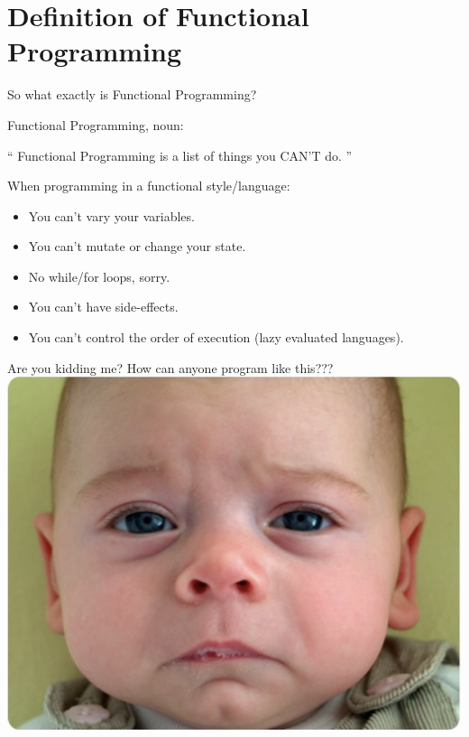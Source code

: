 \documentclass{beamer}
\begin{document}
\section{Definition of Functional Programming}

\begin{frame}{}
  So what exactly is Functional Programming?
\end{frame}

\begin{frame}{Functional Programming, noun:}

  \begin{exampleblock}{}
    {\Huge ``
      Functional Programming is a list of things you CAN’T do.
      ''}
    \vskip5mm
    \hspace*{}
  \end{exampleblock}
\end{frame}

\begin{frame}
  When programming in a functional style/language:
  \begin{itemize}[<+->]
  \item You can't vary your variables.
  \item You can't mutate or change your state.
  \item No while/for loops, sorry.
  \item You can't have side-effects.
  \item You can't control the order of execution (lazy evaluated languages).
  \end{itemize}
\end{frame}

\begin{frame}{Are you kidding me?}
  How can anyone program like this???
  \includegraphics[scale=0.3]{img/sadbaby.png}
\end{frame}
\end{document}
